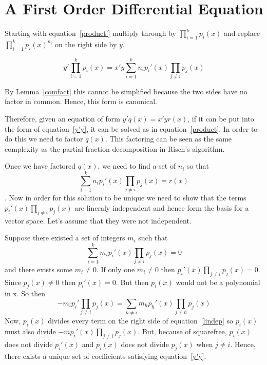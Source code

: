 \section{A First Order Differential Equation}

Starting with equation~\ref{product'} multiply through by
$\prod_{i=1}^k p_i(x)$ and replace $\prod_{i=1}^k p_i(x)^{n_i}$ on the
right side by $y$.

\begin{equation}
{y'} \prod_{i=1}^k p_i(x) = {x'} y \sum_{i=1}^k n_i {p_i'}(x)
\prod_{j \neq i} p_j(x)\label{y'y}
\end{equation}

By Lemma~\ref{comfact} this cannot be simplified because the
two sides have no factor in common.  Hence, this form is
canonical.

Therefore, given an equation of form ${y'} q(x) = {x'} {y } r(x)$, if
it can be put into the form of equation~\ref{y'y}, it can be solved as
in equation~\ref{product}.  In order to do this we need to factor
$q(x)$.  This factoring can be seen as the same complexity as the
partial fraction decomposition in Risch's algorithm.

Once we have factored $q(x)$, we need to find a set of $n_i$ so that
$$\sum_{i=1}^k n_i {p_i'}(x) \prod_{j \neq i} p_j(x) = r(x)$$.  Now in
order for this solution to be unique we need to show that the terms
${p_i'}(x) \prod_{j \neq i} p_j(x)$ are lineraly independent and hence
form the basis for a vector space.  Let's assume that they were not
independent.

Suppose there existed a set of integers $m_i$ such that $$\sum_{i=1}^k
m_i {p_i'}(x) \prod_{j \neq i} p_j(x) = 0$$ and there exists some $m_i
\neq 0$.  If only one $m_i \neq 0$ then ${p_i'}(x) \prod_{j \neq i}
p_j(x) = 0$.  Since $p_j(x) \neq 0$ then ${p_i}'(x) = 0$.  But then
$p_i(x)$ would not be a polynomial in x.  So then
\begin{equation}
-m_i {p_i'} \prod_{j \neq i} p_j(x) = \sum_{h \neq i} m_h {p_h'}(x)
\prod_{j \neq h} p_j(x)\label{lindep}
\end{equation}
Now, $p_i(x)$ divides every term on the right side of
equation~\ref{lindep} so $p_i(x)$ must also divide $-m {p_i'}(x)
\prod_{j \neq i} p_j(x)$.  But, because of squarefree, $p_i(x)$ does
not divide ${p_i'}(x)$ and $p_i(x)$ does
not divide ${p_j}(x)$ when $j \neq i$.  Hence, there exists a unique
set of coefficients satisfying equation~\ref{y'y}.


